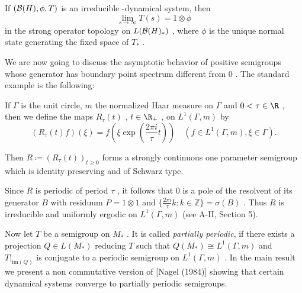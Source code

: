 \begin{corollary}\label{cor:d4-3.9}
If $ (\mathcal{B}(H),\phi,T) $  is an irreducible \WA-dynamical system, then
\[
\lim_{s \to \infty} T(s) = 1 \otimes \phi
\]
in the strong operator topology on $ L(\mathcal{B}(H)_{*}) $ , where $ \phi $  is the unique normal state generating the fixed space of $ T_{*} $ .
\end{corollary}

We are now going to discuss the asymptotic behavior of positive semigroups whose generator has boundary point spectrum different from $ 0 $ .
The standard example is the following:

If $ \Gamma $  is the unit circle, $ m $  the normalized Haar measure on $ \Gamma $  and $ 0 < \tau \in \R $ , then we define the maps $ R_{\tau}(t) $ , $ t \in \R_{+} $ , on $ L^{1}(\Gamma,m) $  by
\[
(R_{\tau}(t)f)(\xi) = f(\xi\exp(\frac{2\pi i}{\tau}t)) \quad (f \in L^{1}(\Gamma,m), \xi \in \Gamma).
\]

Then $ R \coloneqq (R_{\tau}(t))_{t \geq 0} $  forms a strongly continuous one parameter semigroup which is identity preserving and of Schwarz type.


\newpage

Since $ R $  is periodic of period $ \tau $ , it follows that 0 is a pole of the resolvent of its generator $ B $  with residuum $ P = 1 \otimes 1 $  and $ \{\frac{2\pi i}{\tau}k: k \in \mathbb{Z}\} = \sigma(B) $ .
Thus $ R $  is irreducible and uniformly ergodic on $ L^{1}(\Gamma,m) $  (see A-II, Section 5).

Now let $ T $  be a semigroup on $ M_{*} $ .
It is called \textit{partially periodic}, if there exists a projection $ Q \in L(M_{*}) $  reducing $ T $  such that $ Q(M_{*}) \cong L^{1}(\Gamma,m) $  and $ T|_{\text{im}(Q)} $  is conjugate to a periodic semigroup on $ L^{1}(\Gamma,m) $ .
In the main result we present a non commutative version of [Nagel (1984)] showing that certain dynamical systems converge to partially periodic semigroups.

